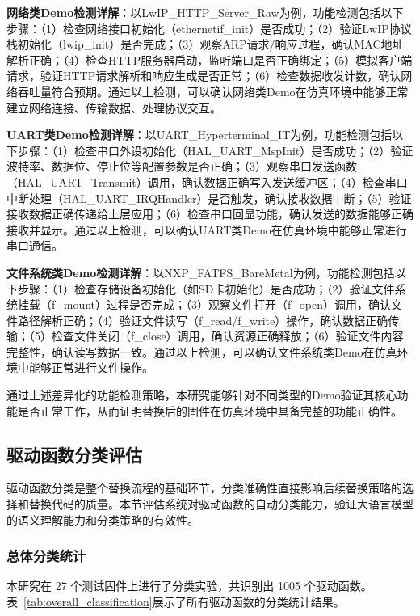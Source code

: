 \textbf{网络类Demo检测详解}：以LwIP\_HTTP\_Server\_Raw为例，功能检测包括以下步骤：（1）检查网络接口初始化（ethernetif\_init）是否成功；（2）验证LwIP协议栈初始化（lwip\_init）是否完成；（3）观察ARP请求/响应过程，确认MAC地址解析正确；（4）检查HTTP服务器启动，监听端口是否正确绑定；（5）模拟客户端请求，验证HTTP请求解析和响应生成是否正常；（6）检查数据收发计数，确认网络吞吐量符合预期。通过以上检测，可以确认网络类Demo在仿真环境中能够正常建立网络连接、传输数据、处理协议交互。

\textbf{UART类Demo检测详解}：以UART\_Hyperterminal\_IT为例，功能检测包括以下步骤：（1）检查串口外设初始化（HAL\_UART\_MspInit）是否成功；（2）验证波特率、数据位、停止位等配置参数是否正确；（3）观察串口发送函数（HAL\_UART\_Transmit）调用，确认数据正确写入发送缓冲区；（4）检查串口中断处理（HAL\_UART\_IRQHandler）是否触发，确认接收数据中断；（5）验证接收数据正确传递给上层应用；（6）检查串口回显功能，确认发送的数据能够正确接收并显示。通过以上检测，可以确认UART类Demo在仿真环境中能够正常进行串口通信。

\textbf{文件系统类Demo检测详解}：以NXP\_FATFS\_BareMetal为例，功能检测包括以下步骤：（1）检查存储设备初始化（如SD卡初始化）是否成功；（2）验证文件系统挂载（f\_mount）过程是否完成；（3）观察文件打开（f\_open）调用，确认文件路径解析正确；（4）验证文件读写（f\_read/f\_write）操作，确认数据正确传输；（5）检查文件关闭（f\_close）调用，确认资源正确释放；（6）验证文件内容完整性，确认读写数据一致。通过以上检测，可以确认文件系统类Demo在仿真环境中能够正常进行文件操作。

通过上述差异化的功能检测策略，本研究能够针对不同类型的Demo验证其核心功能是否正常工作，从而证明替换后的固件在仿真环境中具备完整的功能正确性。

\subsection{驱动函数分类评估}

驱动函数分类是整个替换流程的基础环节，分类准确性直接影响后续替换策略的选择和替换代码的质量。本节评估系统对驱动函数的自动分类能力，验证大语言模型的语义理解能力和分类策略的有效性。

\subsubsection{总体分类统计}

本研究在 27 个测试固件上进行了分类实验，共识别出 1005 个驱动函数。表~\ref{tab:overall_classification}展示了所有驱动函数的分类统计结果。

